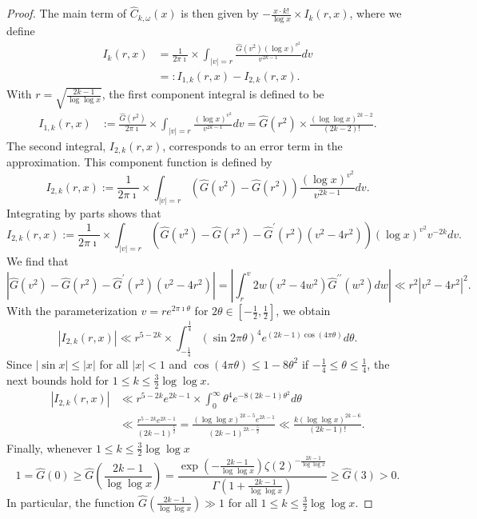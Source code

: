 \documentclass[11pt,reqno,a4letter]{article}
\numberwithin{equation}{section}
\numberwithin{figure}{section}
\numberwithin{table}{section}
\newcommand{\cf}{\textit{cf.\ }}
\theoremstyle{plain}
\numberwithin{theorem}{section}
\theoremstyle{definition}
\begin{document}
\begin{proof}
The main term of $\widehat{C}_{k,\omega}(x)$ 
is then given by $-\frac{x \cdot k!}{\log x} \times I_k(r, x)$, where we define 
\begin{align*}
I_k(r, x) & = \frac{1}{2\pi\imath} \times \int_{|v|=r} 
     \frac{\widehat{G}(v^2) (\log x)^{v^2}}{v^{2k-1}} dv \\ 
     & =: I_{1,k}(r, x) - I_{2,k}(r, x). 
\end{align*}
With $r = \sqrt{\frac{2k-1}{\log\log x}}$, the 
first component integral is defined to be 
\begin{align*}
I_{1,k}(r, x) & := \frac{\widehat{G}(r^2)}{2\pi\imath} \times \int_{|v|=r} 
     \frac{(\log x)^{v^2}}{v^{2k-1}} dv = \widehat{G}(r^2) \times \frac{(\log\log x)^{2k-2}}{(2k-2)!}. 
\end{align*}
The second integral, $I_{2,k}(r, x)$, corresponds to an error term in the approximation. 
This component function is defined by 
\[
I_{2,k}(r, x) := \frac{1}{2\pi\imath} \times \int_{|v|=r} 
     \left(\widehat{G}(v^2) - \widehat{G}(r^2)\right) 
     \frac{(\log x)^{v^2}}{v^{2k-1}} dv. 
\]
Integrating by parts shows that \cite[\cf Thm.\ 7.19; \S 7.4]{MV} 
\[
I_{2,k}(r, x) := \frac{1}{2\pi\imath} \times \int_{|v|=r} 
     \left(\widehat{G}(v^2) - \widehat{G}(r^2) - 
     \widehat{G}^{\prime}(r^2)(v^2-4r^2)\right) 
     (\log x)^{v^2} v^{-2k} dv. 
\]
We find that 
\[
\left\lvert \widehat{G}(v^2) - \widehat{G}(r^2) - 
     \widehat{G}^{\prime}(r^2)(v^2-4r^2) \right\rvert = 
     \left\lvert \int_{r}^{v} 2w (v^2-4w^2) \widehat{G}^{\prime\prime}(w^2) dw \right\rvert 
     \ll r^2 |v^2-4r^2|^2. 
\]
With the parameterization $v = re^{2\pi\imath\theta}$ for 
$2\theta \in \left[-\frac{1}{2}, \frac{1}{2}\right]$, we obtain 
\[
|I_{2,k}(r, x)| \ll r^{5-2k} \times 
     \int_{-\frac{1}{4}}^{\frac{1}{4}} (\sin 2\pi\theta)^4 e^{(2k-1) \cos(4\pi\theta)} d\theta. 
\]
Since $|\sin x| \leq |x|$ for all $|x| < 1$ and $\cos(4\pi\theta) \leq 1 - 8\theta^2$ if 
$-\frac{1}{4} \leq \theta \leq \frac{1}{4}$, the next bounds hold for 
$1 \leq k \leq \frac{3}{2} \log\log x$. 
\begin{align*}
|I_{2,k}(r, x)| & \ll r^{5-2k} e^{2k-1} \times \int_0^{\infty} \theta^4 e^{-8(2k-1) \theta^2} d\theta \\ 
     & \ll \frac{r^{5-2k} e^{2k-1}}{(2k-1)^{\frac{5}{2}}} = 
     \frac{(\log\log x)^{2k-5} e^{2k-1}}{(2k-1)^{2k-\frac{5}{2}}} 
     \ll 
     \frac{k (\log\log x)^{2k-6}}{(2k-1)!}. 
\end{align*}
Finally, whenever $1 \leq k \leq \frac{3}{2} \log\log x$ 
\[
1 = \widehat{G}(0) \geq \widehat{G}\left(\frac{2k-1}{\log\log x}\right) = 
     \frac{\exp\left(-\frac{2k-1}{\log\log x}\right) \zeta(2)^{-\frac{2k-1}{\log\log x}}}{ 
     \Gamma\left(1+\frac{2k-1}{\log\log x}\right)}  
     \geq \widehat{G}(3) > 0. 
\]
In particular, the function 
$\widehat{G}\left(\frac{2k-1}{\log\log x}\right) \gg 1$ for 
all $1 \leq k \leq \frac{3}{2} \log\log x$. 
\end{proof} 
\end{document}
